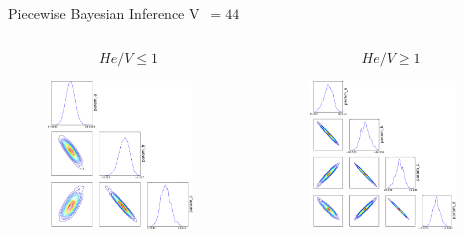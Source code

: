 \documentclass[10pt]{beamer}
\begin{document}
\begin{frame}{Piecewise Bayesian Inference V~$= 44$}
  	\begin{columns}[onlytextwith]
    	\begin{column}{0.43\textwidth}
    	$$He/V \leq 1$$
    	\vspace{1.2cm}
      		\begin{figure}
        		\includegraphics[width=0.9\textwidth]{low44Triangle}
      		\end{figure}
    	\end{column}  
    	\begin{column}{0.59\textwidth}
    	$$He/V \geq 1$$
      		\begin{figure}
        		\includegraphics[width=0.9\textwidth]{high44Triangle}
      		\end{figure}
    	\end{column}
  	\end{columns}
\end{frame}
\end{document}
